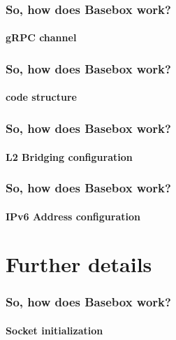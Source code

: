 \documentclass[11pt]{beamer}
\begin{document}

\begin{frame}
\frametitle{So, how does Basebox work?}
\framesubtitle{gRPC channel}


\end{frame}

\begin{frame}
\frametitle{So, how does Basebox work?}
\framesubtitle{code structure}

\end{frame}

\begin{frame}
\frametitle{So, how does Basebox work?}
\framesubtitle{L2 Bridging configuration}

\end{frame}

\begin{frame}
\frametitle{So, how does Basebox work?}
\framesubtitle{IPv6 Address configuration}


\end{frame}



\section{Further details}
\begin{frame}
\frametitle{So, how does Basebox work?}
\framesubtitle{Socket initialization}

\end{frame}




\end{document}
